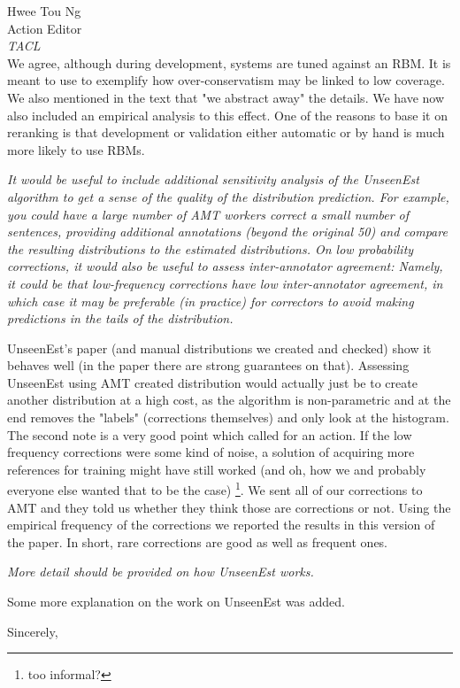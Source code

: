 \documentclass[11pt,letterpaper]{letter}
\begin{document}
\begin{letter}{%
Hwee Tou Ng\\
Action Editor\\
{\em TACL}\\
}
	We agree, although during development, systems are tuned against an RBM. It is meant to use to exemplify how over-conservatism may be linked to low coverage. We also mentioned in the text that "we abstract away" the details. We have now also included an empirical analysis to this effect. One of the reasons to base it on reranking is that development or validation either automatic or by hand is much more likely to use RBMs.
	
	\emph{It would be useful to include additional sensitivity analysis of the
		UnseenEst algorithm to get a sense of the quality of the distribution
		prediction. For example, you could have a large number of AMT workers
		correct a small number of sentences, providing additional annotations
		(beyond the original 50) and compare the resulting distributions to the
		estimated distributions. On low probability corrections, it would also be
		useful to assess inter-annotator agreement: Namely, it could be that
		low-frequency corrections have low inter-annotator agreement, in which case
		it may be preferable (in practice) for correctors to avoid making
		predictions in the tails of the distribution.
		}
		
		UnseenEst's paper (and manual distributions we created and checked) show it behaves well (in the paper there are strong guarantees on that). Assessing UnseenEst using AMT created distribution would actually just be to create another distribution at a high cost, as the algorithm is non-parametric and at the end removes the "labels" (corrections themselves) and only look at the histogram.
		The second note is a very good point which called for an action. If the low frequency corrections were some kind of noise, a solution of acquiring more references for training might have still worked (and oh, how we and probably everyone else wanted that to be the case) \footnote{too informal?}. We sent all of our corrections to AMT and they told us whether they think those are corrections or not. Using the empirical frequency of the corrections we reported the results in this version of the paper. In short, rare corrections are good as well as frequent ones.
		
		\emph{More detail should be provided on how UnseenEst works.}
		
		Some more explanation on the work on UnseenEst was added.
	
\closing{Sincerely,}

\end{letter}
\end{document}
